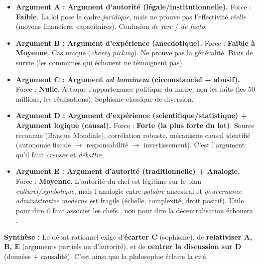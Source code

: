 \documentclass[11pt]{article}
\newcounter{popsec}
\newcounter{popsub}
\newcommand{\courssub}[1]{%
  \stepcounter{popsub}%
  \par\vspace{9pt}\noindent{\popxbold\fontsize{11.5}{13}\selectfont\color{popink}{\color{poporange}\thepopsec.\thepopsub}\hspace{6pt}#1}\par\nopagebreak\vspace{4pt}
}
\begin{document}
\begin{exoresolu}
\begin{itemize}
    \item \textbf{Argument A : Argument d'autorité (légale/institutionnelle).} Force : \textbf{Faible}. La loi pose le cadre \emph{juridique}, mais ne prouve pas l'effectivité \emph{réelle} (moyens financiers, capacitaires). Confusion \emph{de jure} / \emph{de facto}.
    \item \textbf{Argument B : Argument d'expérience (anecdotique).} Force : \textbf{Faible à Moyenne}. Cas unique (\emph{cherry picking}). Ne prouve pas la généralité. Biais de survie (les communes qui échouent ne témoignent pas).
    \item \textbf{Argument C : Argument \emph{ad hominem} (circonstanciel + abusif).} Force : \textbf{Nulle}. Attaque l'appartenance politique du maire, non les faits (les 50 millions, les réalisations). Sophisme classique de diversion.
    \item \textbf{Argument D : Argument d'expérience (scientifique/statistique) + Argument logique (causal).} Force : \textbf{Forte (la plus forte du lot)}. Source reconnue (Banque Mondiale), corrélation robuste, mécanisme causal identifié (autonomie fiscale $\rightarrow$ responsabilité $\rightarrow$ investissement). C'est l'argument qu'il faut \emph{creuser} et \emph{débattre}.
    \item \textbf{Argument E : Argument d'autorité (traditionnelle) + Analogie.} Force : \textbf{Moyenne}. L'autorité du chef est légitime sur le plan \emph{culturel/symbolique}, mais l'analogie entre \emph{palabre} ancestral et \emph{gouvernance administrative moderne} est fragile (échelle, complexité, droit positif). Utile pour dire \guillemotleft il faut associer les chefs \guillemotright, non pour dire \guillemotleft la décentralisation échouera \guillemotright.
\end{itemize}

\textbf{Synthèse :} Le débat rationnel exige d'\textbf{écarter C} (sophisme), de \textbf{relativiser A, B, E} (arguments partiels ou d'autorité), et de \textbf{centrer la discussion sur D} (données + causalité). C'est ainsi que la philosophie éclaire la cité.
\end{exoresolu}

\courssub{Exercice d'entraînement}
\end{document}
